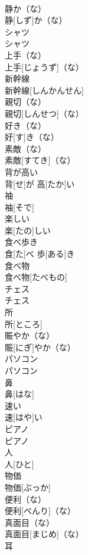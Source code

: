 \documentclass[8pt]{extreport}
\begin{document}
\begin{CJK}{UTF8}{min}
\\	静か（な）	
\\	静[しず]か（な）		
\\	シャツ	
\\	シャツ		
\\	上手（な）	
\\	上手[じょうず]（な）		
\\	新幹線	
\\	新幹線[しんかんせん]		
\\	親切（な）	
\\	親切[しんせつ]（な）		
\\	好き（な）	
\\	好[す]き（な）		
\\	素敵（な）	
\\	素敵[すてき]（な）		
\\	背が高い	
\\	背[せ]が 高[たか]い		
\\	袖	
\\	袖[そで]		
\\	楽しい	
\\	楽[たの]しい		
\\	食べ歩き	
\\	食[た]べ 歩[ある]き		
\\	食べ物	
\\	食べ物[たべもの]		
\\	チェス	
\\	チェス		
\\	所	
\\	所[ところ]		
\\	賑やか（な）	
\\	賑[にぎ]やか（な）		
\\	パソコン	
\\	パソコン		
\\	鼻	
\\	鼻[はな]		
\\	速い	
\\	速[はや]い		
\\	ピアノ	
\\	ピアノ		
\\	人	
\\	人[ひと]		
\\	物価	
\\	物価[ぶっか]		
\\	便利（な）	
\\	便利[べんり]（な）		
\\	真面目（な）	
\\	真面目[まじめ]（な）		
\\	耳	

\end{CJK}
\end{document}
